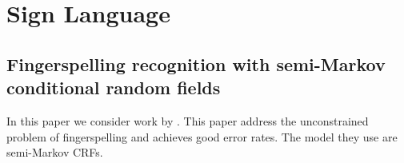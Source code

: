 \chapter{Sign Language}

\section{Fingerspelling recognition with semi-Markov conditional random fields}

In this paper we consider work by \cite{kim2013fingerspelling}.  This paper address
the unconstrained problem of fingerspelling and achieves good error rates.
The model they use are semi-Markov CRFs.

